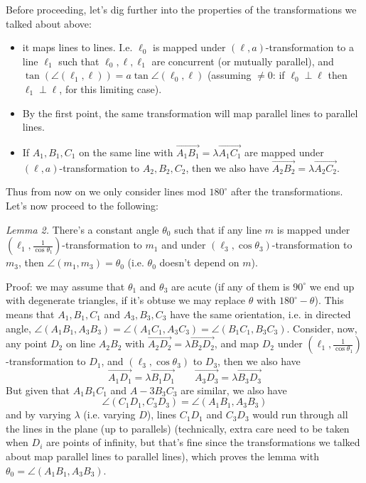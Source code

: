 \documentclass[11pt,a4paper]{article}
\begin{document}
\begin{enumerate}
    Before proceeding, let's dig further into the properties of  the transformations we talked about above: 
    \begin{itemize}
    	\item it maps lines to lines. I.e. $\ell_0$ is mapped under $(\ell, a)$-transformation 
    	to a line $\ell_1$ such that $\ell_0, \ell, \ell_1$ are concurrent (or mutually parallel), 
    	and $\tan(\angle(\ell_1, \ell))=a\tan\angle(\ell_0, \ell)$ (assuming $\neq 0$: if $\ell_0\perp\ell$ then $\ell_1\perp \ell$, for this limiting case). 
    	
    	\item By the first point, the same transformation will map parallel lines to parallel lines. 
    	
    	\item If $A_1, B_1, C_1$ on the same line with $\overrightarrow{A_1B_1}=\lambda\overrightarrow{A_1C_1}$ 
    	are mapped under $(\ell, a)$-transformation to $A_2, B_2, C_2$, then we also have 
    	$\overrightarrow{A_2B_2}=\lambda\overrightarrow{A_2C_2}$. 
    \end{itemize}
    Thus from now on we only consider lines mod $180^{\circ}$ after the transformations. 
    Let's now proceed to the following: 
    
    \emph{Lemma 2.} There's a constant angle $\theta_0$ such that if any line $m$ is mapped under $(\ell_1, \frac{1}{\cos\theta_1})$-transformation to $m_1$ and under $(\ell_3, \cos\theta_3)$-transformation to $m_3$, then $\angle(m_1, m_3)=\theta_0$ (i.e. $\theta_0$ doesn't depend on $m$). 
    
    Proof: we may assume that $\theta_1$ and $\theta_3$ are acute (if any of them is $90^{\circ}$ we end up with degenerate triangles, if it's obtuse we may replace $\theta$ with $180^{\circ}-\theta$). 
    This means that $A_1, B_1, C_1$ and $A_3, B_3, C_3$ have the same orientation, 
    i.e. in directed angle, $\angle(A_1B_1,  A_3B_3)=\angle(A_1C_1, A_3C_3)=\angle(B_1C_1, B_3 C_3)$. 
    Consider, now, any point $D_2$ on line $A_2B_2$ with $\overrightarrow{A_2D_2}=\lambda\overrightarrow{B_2D_2}$, 
    and map $D_2$ under $(\ell_1, \frac{1}{\cos\theta_1})$-transformation
    to $D_1$, 
    and $(\ell_3, \cos\theta_3)$ to $D_3$, 
    then we also have 
    \[
    \overrightarrow{A_1D_1}=\lambda\overrightarrow{B_1D_1}
    \qquad 
    \overrightarrow{A_3D_3}=\lambda\overrightarrow{B_3D_3}
    \]
    But given that $A_1B_1C_1$ and $A-3B_3C_3$ are similar, 
    we also have 
    \[
    \angle(C_1D_1,  C_3D_3)=\angle(A_1B_1,  A_3B_3)
    \]
    and by varying $\lambda$ (i.e. varying $D$), lines $C_1D_1$ and $C_3D_3$ would run through all the lines in the plane (up to parallels) (technically, extra care need to be taken when $D_i$ are points of infinity, but that's fine since the transformations we talked about map parallel lines to parallel lines), 
    which proves the lemma with $\theta_0=\angle(A_1B_1,  A_3B_3)$. 
    

\end{enumerate}
\end{document}
